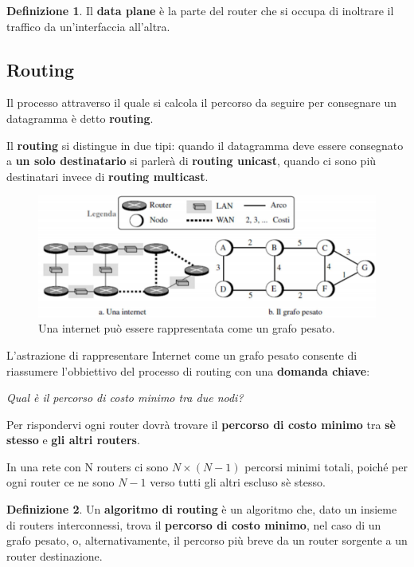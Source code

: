 \documentclass[11pt,a4paper,oneside]{book}
\theoremstyle{definition}
\newtheorem{definition}{Definizione}[section]
\begin{document}
\theoremstyle{definition}
\begin{definition}
	Il \textbf{data plane} è la parte del router che si occupa di inoltrare il traffico da un'interfaccia all'altra.
\end{definition}

\pagebreak

\subsection{Routing}
Il processo attraverso il quale si calcola il percorso da seguire per consegnare un datagramma è detto \textbf{routing}.

Il \textbf{routing} si distingue in due tipi: quando il datagramma deve essere consegnato a \textbf{un solo destinatario} si parlerà di \textbf{routing unicast}, quando ci sono più destinatari invece di \textbf{routing multicast}.

\begin{figure}[!h]
	\includegraphics[scale=0.35]{Immagini/Graph.png}
	\centering
	\caption{Una internet può essere rappresentata come un grafo pesato.}
\end{figure}

L'astrazione di rappresentare Internet come un grafo pesato consente di riassumere l'obbiettivo del processo di routing con una \textbf{domanda chiave}:
\begin{flushleft}
	\textit{Qual è il percorso di costo minimo tra due nodi?}
\end{flushleft}
Per rispondervi ogni router dovrà trovare il \textbf{percorso di costo minimo} tra \textbf{sè stesso} e \textbf{gli altri routers}.

In una rete con N routers ci sono $N \times (N - 1)$ percorsi minimi totali, poiché per ogni router ce ne sono $N - 1$ verso tutti gli altri escluso sè stesso.

\theoremstyle{definition}
\begin{definition}
	Un \textbf{algoritmo di routing} è un algoritmo che, dato un insieme di routers interconnessi, trova il \textbf{percorso di costo minimo}, nel caso di un grafo pesato, o, alternativamente, il percorso più breve da un router sorgente a un router destinazione.
\end{definition}
\end{document}

